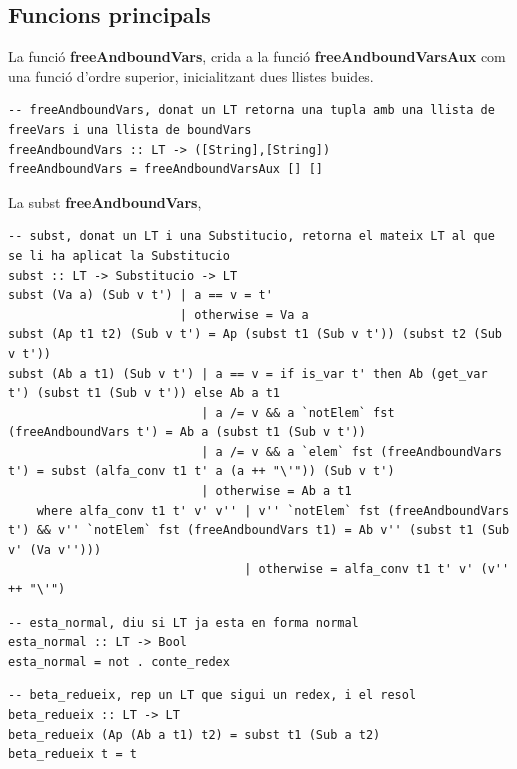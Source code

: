 \documentclass[10pt,a4paper]{article}
\begin{document}
\clearpage

\subsection{Funcions principals}

La funció \textbf{freeAndboundVars}, crida a la funció \textbf{freeAndboundVarsAux} com una funció d'ordre superior, inicialitzant dues llistes buides.

\lstset{language=Haskell, breaklines=true, basicstyle=\footnotesize}
\begin{lstlisting}[frame=mystyle]
-- freeAndboundVars, donat un LT retorna una tupla amb una llista de freeVars i una llista de boundVars
freeAndboundVars :: LT -> ([String],[String])
freeAndboundVars = freeAndboundVarsAux [] []
\end{lstlisting}

La subst \textbf{freeAndboundVars}, 

\lstset{language=Haskell, breaklines=true, basicstyle=\footnotesize}
\begin{lstlisting}[frame=mystyle]
-- subst, donat un LT i una Substitucio, retorna el mateix LT al que se li ha aplicat la Substitucio
subst :: LT -> Substitucio -> LT
subst (Va a) (Sub v t') | a == v = t'
                        | otherwise = Va a
subst (Ap t1 t2) (Sub v t') = Ap (subst t1 (Sub v t')) (subst t2 (Sub v t'))
subst (Ab a t1) (Sub v t') | a == v = if is_var t' then Ab (get_var t') (subst t1 (Sub v t')) else Ab a t1
                           | a /= v && a `notElem` fst (freeAndboundVars t') = Ab a (subst t1 (Sub v t'))
                           | a /= v && a `elem` fst (freeAndboundVars t') = subst (alfa_conv t1 t' a (a ++ "\'")) (Sub v t')
                           | otherwise = Ab a t1
    where alfa_conv t1 t' v' v'' | v'' `notElem` fst (freeAndboundVars t') && v'' `notElem` fst (freeAndboundVars t1) = Ab v'' (subst t1 (Sub v' (Va v'')))
                                 | otherwise = alfa_conv t1 t' v' (v'' ++ "\'")
\end{lstlisting}



\lstset{language=Haskell, breaklines=true, basicstyle=\footnotesize}
\begin{lstlisting}[frame=mystyle]
-- esta_normal, diu si LT ja esta en forma normal
esta_normal :: LT -> Bool
esta_normal = not . conte_redex
\end{lstlisting}



\lstset{language=Haskell, breaklines=true, basicstyle=\footnotesize}
\begin{lstlisting}[frame=mystyle]
-- beta_redueix, rep un LT que sigui un redex, i el resol
beta_redueix :: LT -> LT
beta_redueix (Ap (Ab a t1) t2) = subst t1 (Sub a t2)
beta_redueix t = t
\end{lstlisting}
\end{document}
